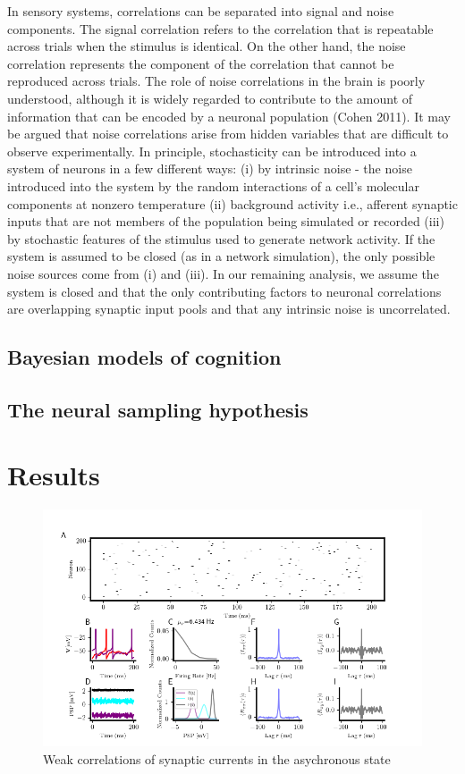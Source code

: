 \documentclass{ucetd}
\begin{document}
In sensory systems, correlations can be separated into signal and noise components. The signal correlation refers to the correlation that is repeatable across trials when the stimulus is identical. On the other hand, the noise correlation represents the component of the correlation that cannot be reproduced across trials. The role of noise correlations in the brain is poorly understood, although it is widely regarded to contribute to the amount of information that can be encoded by a neuronal population (Cohen 2011). It may be argued that noise correlations arise from hidden variables that are difficult to observe experimentally. In principle, stochasticity can be introduced into a system of neurons in a few different ways: (i) by intrinsic noise - the noise introduced into the system by the random interactions of a cell's molecular components at nonzero temperature (ii) background activity i.e., afferent synaptic inputs that are not members of the population being simulated or recorded (iii) by stochastic features of the stimulus used to generate network activity. If the system is assumed to be closed (as in a network simulation), the only possible noise sources come from (i) and (iii). In our remaining analysis, we assume the system is closed and that the only contributing factors to neuronal correlations are overlapping synaptic input pools and that any intrinsic noise is uncorrelated.

\subsection{Bayesian models of cognition}

\subsection{The neural sampling hypothesis}

\section{Results}


\begin{figure}
\centering
\includegraphics[scale=1.1]{figure-2}
\caption{Weak correlations of synaptic currents in the asychronous state}
\label{fig:foo}
\end{figure}
\end{document}
